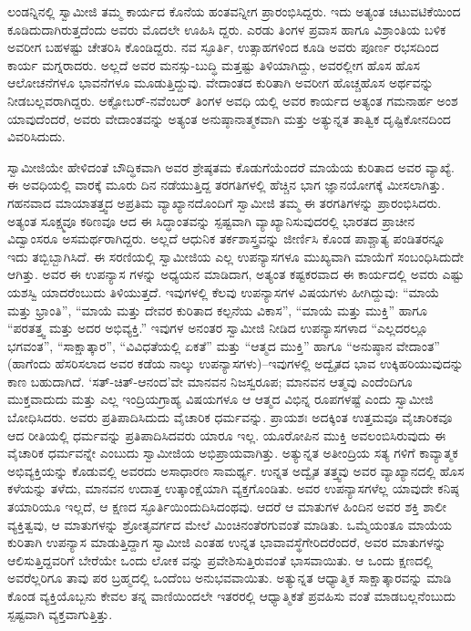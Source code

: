 ಲಂಡನ್ನಿನಲ್ಲಿ ಸ್ವಾಮೀಜಿ ತಮ್ಮ ಕಾರ್ಯದ ಕೊನೆಯ ಹಂತವನ್ನೀಗ ಪ್ರಾರಂಭಿಸಿದ್ದರು. ಇದು ಅತ್ಯಂತ ಚಟುವಟಿಕೆಯಿಂದ ಕೂಡಿದುದಾಗಿರುತ್ತದೆಂದು ಅವರು ಮೊದಲೇ ಊಹಿಸಿ ದ್ದರು. ಎರಡು ತಿಂಗಳ ಪ್ರವಾಸ ಹಾಗೂ ವಿಶ್ರಾಂತಿಯ ಬಳಿಕ ಅವರೀಗ ಬಹಳಷ್ಟು ಚೇತರಿಸಿ ಕೊಂಡಿದ್ದರು. ನವ ಸ್ಫೂರ್ತಿ, ಉತ್ಸಾಹಗಳಿಂದ ಕೂಡಿ ಅವರು ಪೂರ್ಣ ರಭಸದಿಂದ ಕಾರ್ಯ ಮಗ್ನರಾದರು. ಅಲ್ಲದೆ ಅವರ ಮನಸ್ಸು-ಬುದ್ಧಿ ಮತ್ತಷ್ಟು ತಿಳಿಯಾಗಿದ್ದು, ಅವರಲ್ಲೀಗ ಹೊಸ ಹೊಸ ಆಲೋಚನೆಗಳೂ ಭಾವನೆಗಳೂ ಮೂಡುತ್ತಿದ್ದುವು. ವೇದಾಂತದ ಕುರಿತಾಗಿ ಅವರೀಗ ಹೊಚ್ಚಹೊಸ ಅರ್ಥವನ್ನು ನೀಡಬಲ್ಲವರಾಗಿದ್ದರು. ಅಕ್ಟೋಬರ್​-ನವೆಂಬರ್ ತಿಂಗಳ ಅವಧಿ ಯಲ್ಲಿ ಅವರ ಕಾರ್ಯದ ಅತ್ಯಂತ ಗಮನಾರ್ಹ ಅಂಶ ಯಾವುದೆಂದರೆ, ಅವರು ವೇದಾಂತವನ್ನು ಅತ್ಯಂತ ಅನುಷ್ಠಾನಾತ್ಮಕವಾಗಿ ಮತ್ತು ಅತ್ಯುನ್ನತ ತಾತ್ವಿಕ ದೃಷ್ಟಿಕೋನದಿಂದ ವಿವರಿಸಿದುದು.

ಸ್ವಾಮೀಜಿಯೇ ಹೇಳಿದಂತೆ ಬೌದ್ಧಿಕವಾಗಿ ಅವರ ಶ್ರೇಷ್ಠತಮ ಕೊಡುಗೆಯೆಂದರೆ ಮಾಯೆಯ ಕುರಿತಾದ ಅವರ ವ್ಯಾಖ್ಯೆ. ಈ ಅವಧಿಯಲ್ಲಿ ವಾರಕ್ಕೆ ಮೂರು ದಿನ ನಡೆಯುತ್ತಿದ್ದ ತರಗತಿಗಳಲ್ಲಿ ಹೆಚ್ಚಿನ ಭಾಗ ಜ್ಞಾನಯೋಗಕ್ಕೆ ಮೀಸಲಾಗಿತ್ತು. ಗಹನವಾದ ಮಾಯಾತತ್ತ್ವದ ಅಪ್ರತಿಮ ವ್ಯಾಖ್ಯಾನದೊಂದಿಗೆ ಸ್ವಾಮೀಜಿ ತಮ್ಮ ಈ ತರಗತಿಗಳನ್ನು ಪ್ರಾರಂಭಿಸಿದರು. ಅತ್ಯಂತ ಸೂಕ್ಷ್ಮವೂ ಕಠಿಣವೂ ಆದ ಈ ಸಿದ್ಧಾಂತವನ್ನು ಸ್ಪಷ್ಟವಾಗಿ ವ್ಯಾಖ್ಯಾನಿಸುವುದರಲ್ಲಿ ಭಾರತದ ಪ್ರಾಚೀನ ವಿದ್ವಾಂಸರೂ ಅಸಮರ್ಥರಾಗಿದ್ದರು. ಅಲ್ಲದೆ ಆಧುನಿಕ ತರ್ಕಶಾಸ್ತ್ರವನ್ನು ಜೀರ್ಣಿಸಿ ಕೊಂಡ ಪಾಶ್ಚಾತ್ಯ ಪಂಡಿತರನ್ನೂ ಇದು ತಬ್ಬಿಬ್ಬಾಗಿಸಿದೆ. ಈ ಸರಣಿಯಲ್ಲಿ ಸ್ವಾಮೀಜಿಯ ಎಲ್ಲ ಉಪನ್ಯಾಸಗಳೂ ಮುಖ್ಯವಾಗಿ ಮಾಯೆಗೆ ಸಂಬಂಧಿಸಿದುದೇ ಆಗಿತ್ತು. ಅವರ ಈ ಉಪನ್ಯಾಸ ಗಳನ್ನು ಅಧ್ಯಯನ ಮಾಡಿದಾಗ, ಅತ್ಯಂತ ಕಷ್ಟಕರವಾದ ಈ ಕಾರ್ಯದಲ್ಲಿ ಅವರು ಎಷ್ಟು ಯಶಸ್ವಿ ಯಾದರೆಂಬುದು ತಿಳಿಯುತ್ತದೆ. ಇವುಗಳಲ್ಲಿ ಕೆಲವು ಉಪನ್ಯಾಸಗಳ ವಿಷಯಗಳು ಹೀಗಿದ್ದುವು: “ಮಾಯೆ ಮತ್ತು ಭ್ರಾಂತಿ”, “ಮಾಯೆ ಮತ್ತು ದೇವರ ಕುರಿತಾದ ಕಲ್ಪನೆಯ ವಿಕಾಸ”, “ಮಾಯೆ ಮತ್ತು ಮುಕ್ತಿ” ಹಾಗೂ “ಪರತತ್ತ್ವ ಮತ್ತು ಅದರ ಅಭಿವ್ಯಕ್ತಿ.” ಇವುಗಳ ಅನಂತರ ಸ್ವಾಮೀಜಿ ನೀಡಿದ ಉಪನ್ಯಾಸಗಳಾದ “ಎಲ್ಲದರಲ್ಲೂ ಭಗವಂತ”, “ಸಾಕ್ಷಾತ್ಕಾರ”, “ವಿವಿಧತೆಯಲ್ಲಿ ಏಕತೆ” ಮತ್ತು “ಆತ್ಮದ ಮುಕ್ತಿ” ಹಾಗೂ “ಅನುಷ್ಠಾನ ವೇದಾಂತ” (ಹಾಗೆಂದು ಹೆಸರಿಸಲಾದ ಅವರ ಕಡೆಯ ನಾಲ್ಕು ಉಪನ್ಯಾಸಗಳು)–ಇವುಗಳಲ್ಲಿ ಅದ್ವೈತದ ಭಾವ ಉಕ್ಕಿಹರಿಯುವುದನ್ನು ಕಾಣ ಬಹುದಾಗಿದೆ. ‘ಸತ್​-ಚಿತ್​-ಆನಂದ’ವೇ ಮಾನವನ ನಿಜಸ್ವರೂಪ; ಮಾನವನ ಆತ್ಮವು ಎಂದೆಂದಿಗೂ ಮುಕ್ತವಾದುದು ಮತ್ತು ಎಲ್ಲ ಇಂದ್ರಿಯಗ್ರಾಹ್ಯ ವಿಷಯಗಳೂ ಆ ಆತ್ಮದ ವಿಭಿನ್ನ ರೂಪಗಳಷ್ಟೆ ಎಂದು ಸ್ವಾಮೀಜಿ ಬೋಧಿಸಿದರು. ಅವರು ಪ್ರತಿಪಾದಿಸಿದುದು ವೈಚಾರಿಕ ಧರ್ಮವನ್ನು. ಪ್ರಾಯಶಃ ಅದಕ್ಕಿಂತ ಉತ್ತಮವೂ ವೈಚಾರಿಕವೂ ಆದ ರೀತಿಯಲ್ಲಿ ಧರ್ಮವನ್ನು ಪ್ರತಿಪಾದಿಸಿದವರು ಯಾರೂ ಇಲ್ಲ. ಯೂರೋಪಿನ ಮುಕ್ತಿ ಅವಲಂಬಿಸಿರುವುದು ಈ ವೈಚಾರಿಕ ಧರ್ಮವನ್ನೇ ಎಂಬುದು ಸ್ವಾಮೀಜಿಯ ಅಭಿಪ್ರಾಯವಾಗಿತ್ತು. ಅತ್ಯುನ್ನತ ಅತೀಂದ್ರಿಯ ಸತ್ಯ ಗಳಿಗೆ ಕಾವ್ಯಾತ್ಮಕ ಅಭಿವ್ಯಕ್ತಿಯನ್ನು ಕೊಡುವಲ್ಲಿ ಅವರದು ಅಸಾಧಾರಣ ಸಾಮರ್ಥ್ಯ. ಉನ್ನತ ಅದ್ವೈತ ತತ್ತ್ವವು ಅವರ ವ್ಯಾಖ್ಯಾನದಲ್ಲಿ ಹೊಸ ಕಳೆಯನ್ನು ತಳೆದು, ಮಾನವನ ಉದಾತ್ತ ಉತ್ಕಾಂಕ್ಷೆಯಾಗಿ ವ್ಯಕ್ತಗೊಂಡಿತು. ಅವರ ಉಪನ್ಯಾಸಗಳೆಲ್ಲ ಯಾವುದೇ ಕನಿಷ್ಠ ತಯಾರಿಯೂ ಇಲ್ಲದೆ, ಆ ಕ್ಷಣದ ಸ್ಫೂರ್ತಿಯಿಂದುದಿಸಿದಂಥವು. ಆದರೆ ಆ ಮಾತುಗಳ ಹಿಂದಿನ ಅವರ ಶಕ್ತಿ ಶಾಲೀ ವ್ಯಕ್ತಿತ್ವವು, ಆ ಮಾತುಗಳನ್ನು ಶ್ರೋತೃವರ್ಗದ ಮೇಲೆ ಮಿಂಚಿನಂತೆರಗುವಂತೆ ಮಾಡಿತು. ಒಮ್ಮೆಯಂತೂ ಮಾಯೆಯ ಕುರಿತಾಗಿ ಉಪನ್ಯಾಸ ಮಾಡುತ್ತಿದ್ದಾಗ ಸ್ವಾಮೀಜಿ ಎಂತಹ ಉನ್ನತ ಭಾವಾವಸ್ಥೆಗೇರಿದರೆಂದರೆ, ಅವರ ಮಾತುಗಳನ್ನು ಆಲಿಸುತ್ತಿದ್ದವರಿಗೆ ಬೇರೆಯೇ ಒಂದು ಲೋಕ ವನ್ನು ಪ್ರವೇಶಿಸುತ್ತಿರುವಂತೆ ಭಾಸವಾಯಿತು. ಆ ಒಂದು ಕ್ಷಣದಲ್ಲಿ ಅವರೆಲ್ಲರಿಗೂ ತಾವು ಪರ ಬ್ರಹ್ಮದಲ್ಲಿ ಒಂದೆಂಬ ಅನುಭವವಾಯಿತು. ಅತ್ಯುನ್ನತ ಆಧ್ಯಾತ್ಮಿಕ ಸಾಕ್ಷಾತ್ಕಾರವನ್ನು ಮಾಡಿ ಕೊಂಡ ವ್ಯಕ್ತಿಯೊಬ್ಬನು ಕೇವಲ ತನ್ನ ವಾಣಿಯಿಂದಲೇ ಇತರರಲ್ಲಿ ಆಧ್ಯಾತ್ಮಿಕತೆ ಪ್ರವಹಿಸು ವಂತೆ ಮಾಡಬಲ್ಲನೆಂಬುದು ಸ್ಪಷ್ಟವಾಗಿ ವ್ಯಕ್ತವಾಗುತ್ತಿತ್ತು.

